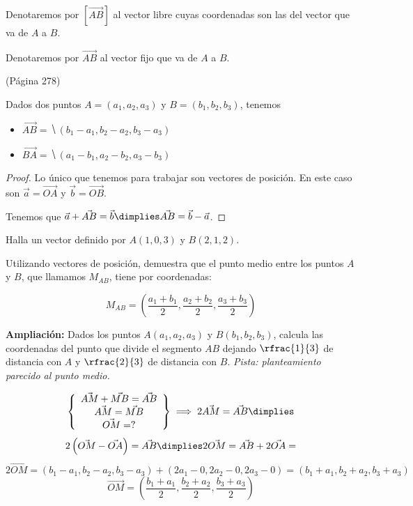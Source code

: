 Denotaremos por $[\vec{AB}]$ al vector libre cuyas coordenadas son las del vector que va de $A$ a $B$.

Denotaremos por $\vec{AB}$ al vector fijo que va de $A$ a $B$.





\begin{defn}
(Página 278)

Dados dos puntos $A=(a_1,a_2,a_3)$ y $B = (b_1,b_2,b_3)$, tenemos 
    \begin{itemize}
        \item $\vec{AB} = \hide{(b_1-a_1, b_2-a_2, b_3-a_3)}$
        \item $\vec{BA} = \hide{(a_1-b_1, a_2-b_2, a_3-b_3)}$ 
    \end{itemize}
\end{defn}

\begin{proof}
Lo único que tenemos para trabajar son vectores de posición. 
%
En este caso son $\vec{a} = \vec{OA}$ y $\vec{b} = \vec{OB}$. 

Tenemos que $\vec{a} + \vec{AB} = \vec{b} \dimplies \vec{AB} = \vec{b}-\vec{a}$.
\end{proof}

\begin{example}
    Halla un vector definido por $A(1,0,3)$ y $B(2,1,2)$.
    
    \hide{\[\vec{AB} = (2-1, 1-0, 2-3) = (1,1,-1)\]}
\end{example}

\begin{problem}

Utilizando vectores de posición, demuestra que el punto medio entre los puntos $A$ y $B$, que llamamos $M_{AB}$, tiene por coordenadas:

\[M_{AB} = \left(\frac{a_1+b_1}{2},\frac{a_2+b_2}{2},\frac{a_3+b_3}{2}\right)\]

\ppart \textbf{Ampliación:} Dados los puntos $A(a_1,a_2,a_3)$ y $B(b_1,b_2,b_3)$, calcula las coordenadas del punto que divide el segmento $AB$ dejando $\rfrac{1}{3}$ de distancia con $A$ y $\rfrac{2}{3}$ de distancia con $B$. \textit{Pista: planteamiento parecido al punto medio.}

\solution

\[
\left\{
\begin{array}{c}
    \vec{AM} + \vec{MB} = \vec{AB}\\
    \vec{AM} = \vec{MB}\\
    \vec{OM} = ?
\end{array}\right\}
 \implies 
  2\vec{AM} = \vec{AB} \dimplies
  \]\[ 
  2\left(\vec{OM} - \vec{OA}\right) = \vec{AB} \dimplies
  2\vec{OM} = \vec{AB} + 2\vec{OA} = 
  \]\[
  2\vec{OM} = \left(
  b_1-a_1,
  b_2-a_2,
  b_3-a_3
  \right) + 
  \left(
  2a_1 - 0,
  2a_2 - 0,
  2a_3 - 0
  \right) = 
  \left(
  b_1+a_1,
  b_2+a_2,
  b_3+a_3
  \right)\]\[
  \vec{OM} = \left(
  \frac{b_1+a_1}{2},
  \frac{b_2+a_2}{2},
  \frac{b_3+a_3}{2}
  \right)
\]

\end{problem}


